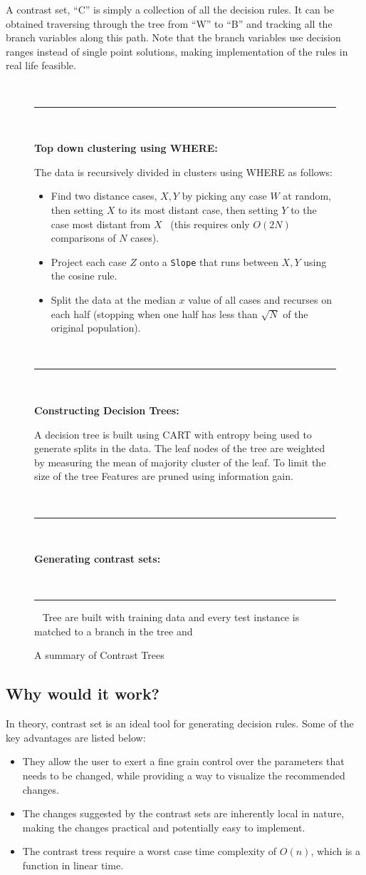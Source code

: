 \documentclass[conference]{IEEEtran}
\begin{document}
A contrast set, ``C'' is simply a collection of all the decision rules. It can be obtained traversing through the tree from ``W'' to ``B'' and tracking all the branch variables along this path. Note that the branch variables use decision ranges instead of single point solutions, making implementation of the rules in real life feasible. 
\begin{figure}[t]
    \small
    ~\hrule~
    
    {\bf Top down clustering using WHERE:}
    
    The data is recursively divided in clusters using WHERE as follows:
    \begin{itemize}
        
        \item Find   two   distance cases,  $X,Y$
        by picking any case $W$ at random, then setting $X$ to its most
        distant case, then setting $Y$ to the case most distant from
        $X$~\cite{fastmap}
        (this requires only $O(2N)$ comparisons
        of $N$ cases).
        \item Project each case $Z$
        onto a {\tt Slope} that  runs between $X,Y$ using the cosine
        rule. 
        \item Split the data at the median $x$ value of all cases and
        recurses on each half  (stopping when
        one half has less  than $\sqrt{N}$ of the original population).
    \end{itemize}
    ~\hrule~
    
    {\bf Constructing Decision Trees:}
    
    A decision tree is built using CART with entropy being used to generate splits in the data. The leaf nodes of the tree are weighted by measuring the mean of majority cluster of the leaf. To limit the size of the tree Features are pruned using information gain.
    
    ~\hrule~
    
    {\bf Generating contrast sets:}
    
    ~\hrule~
    Tree are built with training data and every test instance is matched to a branch in the tree and 
    \caption{A summary of Contrast Trees}
    \label{fig:contast_trees}
\end{figure}

\subsection{Why would it work?}
In theory, contrast set is an ideal tool for generating decision rules. Some of the key advantages are listed below:
\begin{itemize}
\item They allow the user to exert a fine grain control over the parameters that needs to be changed, while providing a way to visualize the recommended changes.
\item The changes suggested by the contrast sets are inherently local in nature, making the changes practical and potentially easy to implement.
\item The contrast tress require a worst case time complexity of $O(n)$, which is a function in linear time.
\end{itemize}
\end{document}
